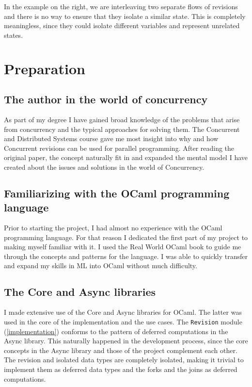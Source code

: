 \documentclass[12pt,twoside,notitlepage]{report}
\begin{document}
In the example on the right, we are interleaving two separate flows of revisions and there is no way to ensure that they isolate a similar state. This is completely meaningless, since they could isolate different variables and represent unrelated states.





\cleardoublepage



\chapter{Preparation}
\section{The author in the world of concurrency}
As part of my degree I have gained broad knowledge of the problems that arise from concurrency and the typical approaches for solving them. The Concurrent and Distributed Systems course gave me most insight into why and how Concurrent revisions can be used for parallel programming. After reading the original paper, the concept naturally fit in and expanded the mental model I have created about the issues and solutions in the world of Concurrency.  

\section{Familiarizing with the OCaml programming language}
Prior to starting the project, I had almost no experience with the OCaml programming language. For that reason I dedicated the first part of my project to making myself familiar with it. I used the Real World OCaml book \cite{realocaml} to guide me through the concepts and patterns for the language. I was able to quickly transfer and expand my skills in ML into OCaml without much difficulty.

\section{The Core and Async libraries}
I made extensive use of the Core and Async libraries for OCaml. The latter was used in the core of the implementation and the use cases. The {\tt Revision} module (\ref{implementation}) conforms to the pattern of deferred computations in the Async library. This naturally happened in the development process, since the core concepts in the Async library and those of the project complement each other. The revision and isolated data types are completely isolated, making it trivial to implement them as deferred data types and the forks and the joins as deferred computations.  
\end{document}
